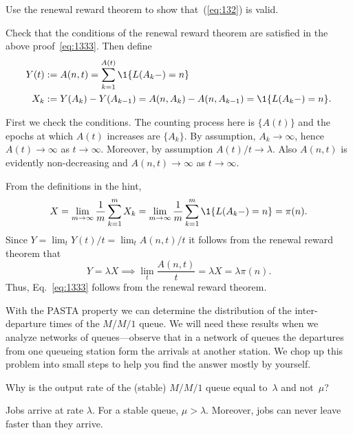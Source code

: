 \begin{exercise}
Use the renewal reward theorem to show that~(\ref{eq:132}) is valid.
\begin{hint}
Check that the conditions of the renewal reward theorem are satisfied in the above proof~\eqref{eq:1333}. Then define  
\begin{align*}
  Y(t) &:= A(n,t) = \sum_{k=1}^{A(t)} \1{L(A_k-) = n} \\
X_k &:= Y(A_k) - Y(A_{k-1}) = A(n, A_k) - A(n, A_{k-1}) = \1{L(A_k-)=n}.
\end{align*}

\end{hint}
\begin{solution}
First we check the conditions.  The counting process here is $\{A(t)\}$ and the epochs at which
    $A(t)$ increases are $\{A_k\}$. By assumption, $A_k\to\infty$,
    hence $A(t)\to\infty$ as $t\to\infty$. Moreover, by assumption
    $A(t)/t \to \lambda$. Also $A(n,t)$ is evidently non-decreasing and
    $A(n,t)\to\infty$ as $t\to\infty$.


From the definitions in the hint,   
\begin{equation*}
X= \lim_{m\to\infty} \frac 1 m \sum_{k=1}^m X_k =\lim_{m\to\infty} \frac 1 m \sum_{k=1}^m \1{L(A_k-)=n} = \pi(n).
\end{equation*}
Since $Y=\lim_t Y(t)/t = \lim_t A(n,t)/t$ it follows from the renewal reward theorem that
\begin{equation*}
  Y=\lambda X \implies \lim_t \frac{A(n,t)} t = \lambda X = \lambda \pi(n).
\end{equation*}
Thus, Eq.~\eqref{eq:1333} follows from the renewal reward theorem.
\end{solution}
\end{exercise}



With the PASTA property we can determine the distribution
of the inter-departure times of the $M/M/1$ queue.  We will need these
results when we analyze networks of queues---observe that in a network
of queues the departures from one queueing station form the arrivals
at another station. We chop up this problem into small steps to help you
find the answer mostly by yourself.


\begin{exercise}\label{ex:dep}
Why is the output rate of the (stable) $M/M/1$ queue equal to~$\lambda$ and not~$\mu$?
\begin{solution}
Jobs arrive at rate $\lambda$. For a stable queue, $\mu>\lambda$. Moreover,  jobs can never leave faster than they arrive.
\end{solution}
\end{exercise}


